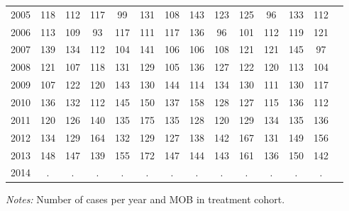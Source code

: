 \begin{table}[H]
\begin{threeparttable}
{\begin{tabular}{l*{13}{c}}
2005        &         118&         112&         117&          99&         131&         108&         143&         123&         125&          96&         133&         112\\
2006        &         113&         109&          93&         117&         111&         117&         136&          96&         101&         112&         119&         121\\
2007        &         139&         134&         112&         104&         141&         106&         106&         108&         121&         121&         145&          97\\
2008        &         121&         107&         118&         131&         129&         105&         136&         127&         122&         120&         113&         104\\
2009        &         107&         122&         120&         143&         130&         144&         114&         134&         130&         111&         130&         117\\
2010        &         136&         132&         112&         145&         150&         137&         158&         128&         127&         115&         136&         112\\
2011        &         120&         126&         140&         135&         175&         135&         128&         120&         129&         134&         135&         136\\
2012        &         134&         129&         164&         132&         129&         127&         138&         142&         167&         131&         149&         156\\
2013        &         148&         147&         139&         155&         172&         147&         144&         143&         161&         136&         150&         142\\
2014        &           .&           .&           .&           .&           .&           .&           .&           .&           .&           .&           .&           .\\
 \bottomrule \end{tabular} } \begin{tablenotes} \item \scriptsize \emph{Notes:} Number of cases per year and MOB in treatment cohort. \end{tablenotes} \end{threeparttable} \end{table} 
